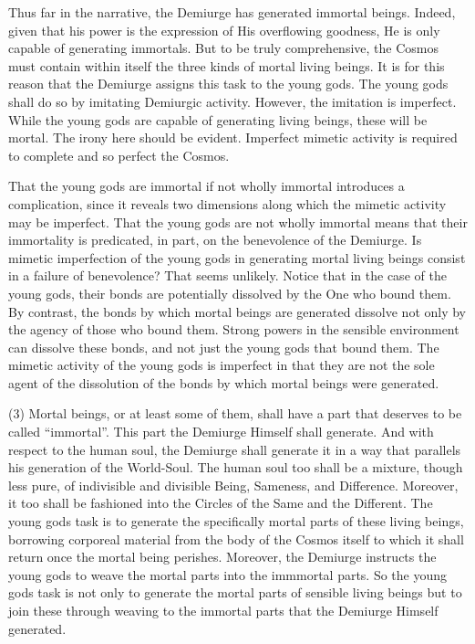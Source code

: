 Thus far in the narrative, the Demiurge has generated immortal beings. Indeed, given that his power is the expression of His overflowing goodness, He is only capable of generating immortals. But to be truly comprehensive, the Cosmos must contain within itself the three kinds of mortal living beings. It is for this reason that the Demiurge assigns this task to the young gods. The young gods shall do so by imitating Demiurgic activity. However, the imitation is imperfect. While the young gods are capable of generating living beings, these will be mortal. The irony here should be evident. Imperfect mimetic activity is required to complete and so perfect the Cosmos.

That the young gods are immortal if not wholly immortal introduces a complication, since it reveals two dimensions along which the mimetic activity may be imperfect. That the young gods are not wholly immortal means that their immortality is predicated, in part, on the benevolence of the Demiurge. Is mimetic imperfection of the young gods in generating mortal living beings consist in a failure of benevolence? That seems unlikely. Notice that in the case of the young gods, their bonds are potentially dissolved by the One who bound them. By contrast, the bonds by which mortal beings are generated dissolve not only by the agency of those who bound them. Strong powers in the sensible environment can dissolve these bonds, and not just the young gods that bound them. The mimetic activity of the young gods is imperfect in that they are not the sole agent of the dissolution of the bonds by which mortal beings were generated.

(3) Mortal beings, or at least some of them, shall have a part that deserves to be called ``immortal''. This part the Demiurge Himself shall generate. And with respect to the human soul, the Demiurge shall generate it in a way that parallels his generation of the World-Soul. The human soul too shall be a mixture, though less pure, of indivisible and divisible Being, Sameness, and Difference. Moreover, it too shall be fashioned into the Circles of the Same and the Different. The young gods task is to generate the specifically mortal parts of these living beings, borrowing corporeal material from the body of the Cosmos itself to which it shall return once the mortal being perishes. Moreover, the Demiurge instructs the young gods to weave the mortal parts into the immmortal parts. So the young gods task is not only to generate the mortal parts of sensible living beings but to join these through weaving to the immortal parts that the Demiurge Himself generated.

